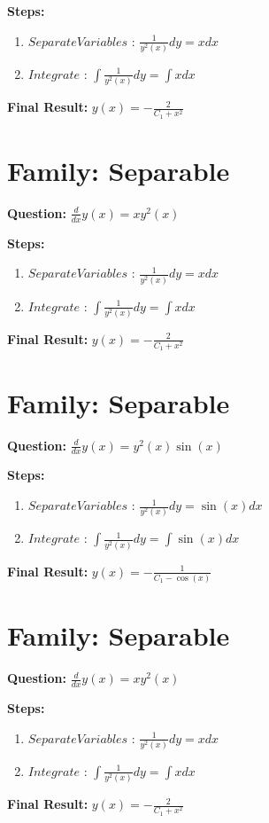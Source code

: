 \documentclass{article}
\begin{document}
\textbf{Steps:}
\begin{enumerate}
\item $Separate Variables$ :  $\frac{1}{y^{2}{\left(x \right)}} dy = x dx$
\item $Integrate$ :  $\int \frac{1}{y^{2}{\left(x \right)}} dy = \int x dx$
\end{enumerate}
\textbf{Final Result:} $y{\left(x \right)} = - \frac{2}{C_{1} + x^{2}}$

\section*{Family: Separable}
\textbf{Question:} $\frac{d}{d x} y{\left(x \right)} = x y^{2}{\left(x \right)}$

\textbf{Steps:}
\begin{enumerate}
\item $Separate Variables$ :  $\frac{1}{y^{2}{\left(x \right)}} dy = x dx$
\item $Integrate$ :  $\int \frac{1}{y^{2}{\left(x \right)}} dy = \int x dx$
\end{enumerate}
\textbf{Final Result:} $y{\left(x \right)} = - \frac{2}{C_{1} + x^{2}}$

\section*{Family: Separable}
\textbf{Question:} $\frac{d}{d x} y{\left(x \right)} = y^{2}{\left(x \right)} \sin{\left(x \right)}$

\textbf{Steps:}
\begin{enumerate}
\item $Separate Variables$ :  $\frac{1}{y^{2}{\left(x \right)}} dy = \sin{\left(x \right)} dx$
\item $Integrate$ :  $\int \frac{1}{y^{2}{\left(x \right)}} dy = \int \sin{\left(x \right)} dx$
\end{enumerate}
\textbf{Final Result:} $y{\left(x \right)} = - \frac{1}{C_{1} - \cos{\left(x \right)}}$

\section*{Family: Separable}
\textbf{Question:} $\frac{d}{d x} y{\left(x \right)} = x y^{2}{\left(x \right)}$

\textbf{Steps:}
\begin{enumerate}
\item $Separate Variables$ :  $\frac{1}{y^{2}{\left(x \right)}} dy = x dx$
\item $Integrate$ :  $\int \frac{1}{y^{2}{\left(x \right)}} dy = \int x dx$
\end{enumerate}
\textbf{Final Result:} $y{\left(x \right)} = - \frac{2}{C_{1} + x^{2}}$
\end{document}
